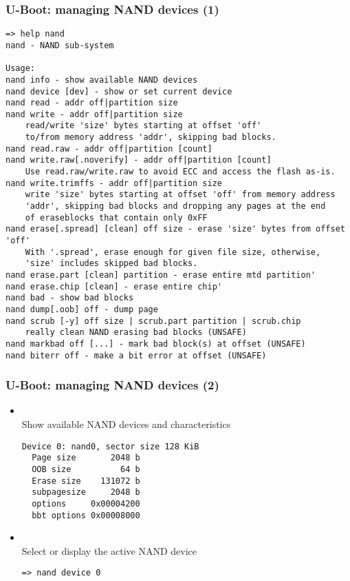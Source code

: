 \begin{frame}[fragile]
  \frametitle{U-Boot: managing NAND devices (1)}
  \begin{block}{}
  \tiny
  \begin{verbatim}
=> help nand
nand - NAND sub-system

Usage:
nand info - show available NAND devices
nand device [dev] - show or set current device
nand read - addr off|partition size
nand write - addr off|partition size
    read/write 'size' bytes starting at offset 'off'
    to/from memory address 'addr', skipping bad blocks.
nand read.raw - addr off|partition [count]
nand write.raw[.noverify] - addr off|partition [count]
    Use read.raw/write.raw to avoid ECC and access the flash as-is.
nand write.trimffs - addr off|partition size
    write 'size' bytes starting at offset 'off' from memory address
    'addr', skipping bad blocks and dropping any pages at the end
    of eraseblocks that contain only 0xFF
nand erase[.spread] [clean] off size - erase 'size' bytes from offset 'off'
    With '.spread', erase enough for given file size, otherwise,
    'size' includes skipped bad blocks.
nand erase.part [clean] partition - erase entire mtd partition'
nand erase.chip [clean] - erase entire chip'
nand bad - show bad blocks
nand dump[.oob] off - dump page
nand scrub [-y] off size | scrub.part partition | scrub.chip
    really clean NAND erasing bad blocks (UNSAFE)
nand markbad off [...] - mark bad block(s) at offset (UNSAFE)
nand biterr off - make a bit error at offset (UNSAFE)
  \end{verbatim}
  \end{block}
\end{frame}


\begin{frame}[fragile]
  \frametitle{U-Boot: managing NAND devices (2)}
  \begin{itemize}
  \item {}\\
    Show available NAND devices and characteristics
    \begin{block}{}
    \footnotesize
    \begin{verbatim}
Device 0: nand0, sector size 128 KiB
  Page size       2048 b
  OOB size          64 b
  Erase size    131072 b
  subpagesize     2048 b
  options     0x00004200
  bbt options 0x00008000
    \end{verbatim}
    \end{block}
  \item {}\\
    Select or display the active NAND device
    \begin{block}{}
    \footnotesize
    \begin{verbatim}
=> nand device 0
    \end{verbatim}
    \end{block}
  \end{itemize}
\end{frame}

